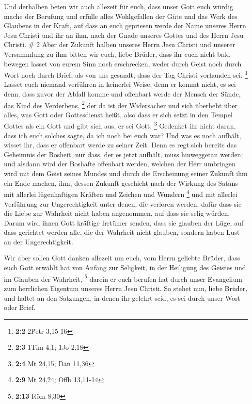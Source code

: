  Und derhalben beten wir auch allezeit für euch, dass
unser Gott euch würdig mache der Berufung und erfülle alles Wohlgefallen
der Güte und das Werk des Glaubens in der Kraft,  auf
dass an euch gepriesen werde der Name unseres Herrn Jesu Christi und ihr
an ihm, nach der Gnade unseres Gottes und des Herrn Jesu Christi. \# 2
 Aber der Zukunft halben unseres Herrn Jesu Christi und
unserer Versammlung zu ihm bitten wir euch, liebe Brüder, 
dass ihr euch nicht bald bewegen lasset von eurem Sinn noch erschrecken,
weder durch Geist noch durch Wort noch durch Brief, als von uns gesandt,
dass der Tag Christi vorhanden sei. \footnote{\textbf{2:2} 2Petr 3,15-16}
 Lasset euch niemand verführen in keinerlei Weise; denn er
kommt nicht, es sei denn, dass zuvor der Abfall komme und offenbart
werde der Mensch der Sünde, das Kind des Verderbens, \footnote{\textbf{2:3}
  1Tim 4,1; 1Jo 2,18}  der da ist der Widersacher und sich
überhebt über alles, was Gott oder Gottesdienst heißt, also dass er sich
setzt in den Tempel Gottes als ein Gott und gibt sich aus, er sei Gott.
\footnote{\textbf{2:4} Mt 24,15; Dan 11,36}  Gedenket ihr
nicht daran, dass ich euch solches sagte, da ich noch bei euch war?
 Und was es noch aufhält, wisset ihr, dass er offenbart
werde zu seiner Zeit.  Denn es regt sich bereits das
Geheimnis der Bosheit, nur dass, der es jetzt aufhält, muss hinweggetan
werden;  und alsdann wird der Boshafte offenbart werden,
welchen der Herr umbringen wird mit dem Geist seines Mundes und durch
die Erscheinung seiner Zukunft ihm ein Ende machen,  ihm,
dessen Zukunft geschieht nach der Wirkung des Satans mit allerlei
lügenhaftigen Kräften und Zeichen und Wundern \footnote{\textbf{2:9} Mt
  24,24; Offb 13,11-14}  und mit allerlei Verführung zur
Ungerechtigkeit unter denen, die verloren werden, dafür dass sie die
Liebe zur Wahrheit nicht haben angenommen, auf dass sie selig würden.
 Darum wird ihnen Gott kräftige Irrtümer senden, dass sie
glauben der Lüge,  auf dass gerichtet werden alle, die
der Wahrheit nicht glauben, sondern haben Lust an der Ungerechtigkeit.

 Wir aber sollen Gott danken allezeit um euch, vom Herrn
geliebte Brüder, dass euch Gott erwählt hat von Anfang zur Seligkeit, in
der Heiligung des Geistes und im Glauben der Wahrheit, \footnote{\textbf{2:13}
  Röm 8,30}  darein er euch berufen hat durch unser
Evangelium zum herrlichen Eigentum unseres Herrn Jesu Christi.
 So stehet nun, liebe Brüder, und haltet an den
Satzungen, in denen ihr gelehrt seid, es sei durch unser Wort oder
Brief.

